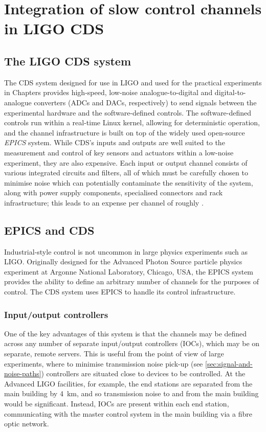 \chapter{Integration of slow control channels in LIGO CDS}
\label{c:slow-controls-integration}

\section{The LIGO CDS system}
The \gls{CDS} system designed for use in \gls{LIGO} and used for the practical experiments in Chapters  provides high-speed, low-noise analogue-to-digital and digital-to-analogue converters (\glspl{ADC} and \glspl{DAC}, respectively) to send signals between the experimental hardware and the software-defined controls. The software-defined controls run within a real-time Linux kernel, allowing for deterministic operation, and the channel infrastructure is built on top of the widely used open-source \emph{\gls{EPICS}} system. While \gls{CDS}'s inputs and outputs are well suited to the measurement and control of key sensors and actuators within a low-noise experiment, they are also expensive. Each input or output channel consists of various integrated circuits and filters, all of which must be carefully chosen to minimise noise which can potentially contaminate the sensitivity of the system, along with power supply components, specialised connectors and rack infrastructure; this leads to an expense per channel of roughly .

\section{EPICS and CDS}
Industrial-style control is not uncommon in large physics experiments such as \gls{LIGO}. Originally designed for the Advanced Photon Source particle physics experiment at Argonne National Laboratory, Chicago, USA, the \gls{EPICS} system provides the ability to define an arbitrary number of channels for the purposes of control. The \gls{CDS} system uses \gls{EPICS} to handle its control infrastructure.

\subsection{Input/output controllers}
One of the key advantages of this system is that the channels may be defined across any number of separate input/output controllers (\glspl{IOC}), which may be on separate, remote servers. This is useful from the point of view of large experiments, where to minimise transmission noise pick-up (see \ref{sec:signal-and-noise-paths}) controllers are situated close to devices to be controlled. At the Advanced LIGO facilities, for example, the end stations are separated from the main building by \SI{4}{\kilo\meter}, and so transmission noise to and from the main building would be significant. Instead, \glspl{IOC} are present within each end station, communicating with the master control system in the main building via a fibre optic network.

